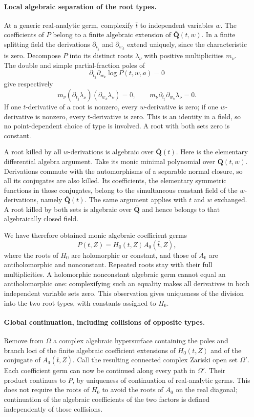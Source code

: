 \paragraph{Local algebraic separation of the root types.}
At a generic real-analytic germ, complexify $\bar t$ to independent
variables $w$. The coefficients of $P$ belong to a finite algebraic
extension of $\overline{\mathbf Q}(t,w)$. In a finite splitting
field the derivations $\partial_{t_j}$ and $\partial_{w_k}$ extend
uniquely, since the characteristic is zero. Decompose $P$ into its
distinct roots $\lambda_\nu$ with positive multiplicities $m_\nu$.
The double and simple partial-fraction poles of
\[
 \partial_{t_j}\partial_{w_k}\log P(t,w,a)=0
\]
give respectively
\[
 m_\nu(\partial_{t_j}\lambda_\nu)
        (\partial_{w_k}\lambda_\nu)=0,
 \qquad
 m_\nu\partial_{t_j}\partial_{w_k}\lambda_\nu=0.
\]
If one $t$-derivative of a root is nonzero, every $w$-derivative
is zero; if one $w$-derivative is nonzero, every $t$-derivative
is zero. This is an identity in a field, so no point-dependent
choice of type is involved. A root with both sets zero is constant.

A root killed by all $w$-derivations is algebraic over
$\overline{\mathbf Q}(t)$. Here is the elementary differential
algebra argument. Take its monic minimal polynomial over
$\overline{\mathbf Q}(t,w)$. Derivations commute with the
automorphisms of a separable normal closure, so all its conjugates
are also killed. Its coefficients, the elementary symmetric
functions in those conjugates, belong to the simultaneous constant
field of the $w$-derivations, namely $\overline{\mathbf Q}(t)$.
The same argument applies with $t$ and $w$ exchanged. A root killed
by both sets is algebraic over $\overline{\mathbf Q}$ and hence
belongs to that algebraically closed field.

We have therefore obtained monic algebraic coefficient germs
\[
 P(t,Z)=H_0(t,Z)A_0(\bar t,Z),
\]
where the roots of $H_0$ are holomorphic or constant, and those of
$A_0$ are antiholomorphic and nonconstant. Repeated roots stay with
their full multiplicities. A holomorphic nonconstant algebraic
germ cannot equal an antiholomorphic one: complexifying such an
equality makes all derivatives in both independent variable sets
zero. This observation gives uniqueness of the division into the
two root types, with constants assigned to $H_0$.

\paragraph{Global continuation, including collisions of opposite types.}
Remove from $\Omega$ a complex algebraic hypersurface containing
the poles and branch loci of the finite algebraic coefficient
extensions of $H_0(t,Z)$ and of the conjugate of
$A_0(\bar t,Z)$. Call the resulting connected complex Zariski
open set $\Omega'$. Each coefficient germ can now be continued
along every path in $\Omega'$. Their product continues to $P$,
by uniqueness of continuation of real-analytic germs. This does
not require the roots of $H_0$ to avoid the roots of $A_0$ on the
real diagonal; continuation of the algebraic coefficients of
the two factors is defined independently of those collisions.

